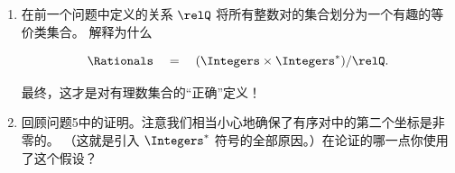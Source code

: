 \begin{enumerate}
    \workbookpagebreak
    
    \item 在前一个问题中定义的关系 $\relQ$ 将所有整数对的集合划分为一个有趣的等价类集合。
    解释为什么
    
    \[ \Rationals \quad = \quad (\Integers \times \Integers^{\ast}) / \relQ.
    \]
    
    \noindent 最终，这才是对有理数集合的“正确”定义！
    
    \wbvfill
    
    
    \item 回顾问题5中的证明。注意我们相当小心地确保了有序对中的第二个坐标是非零的。
    （这就是引入 $\Integers^{\ast}$ 符号的全部原因。）在论证的哪一点你使用了这个假设？
    
    \wbvfill
    
    \workbookpagebreak
    
    \end{enumerate} 
    
